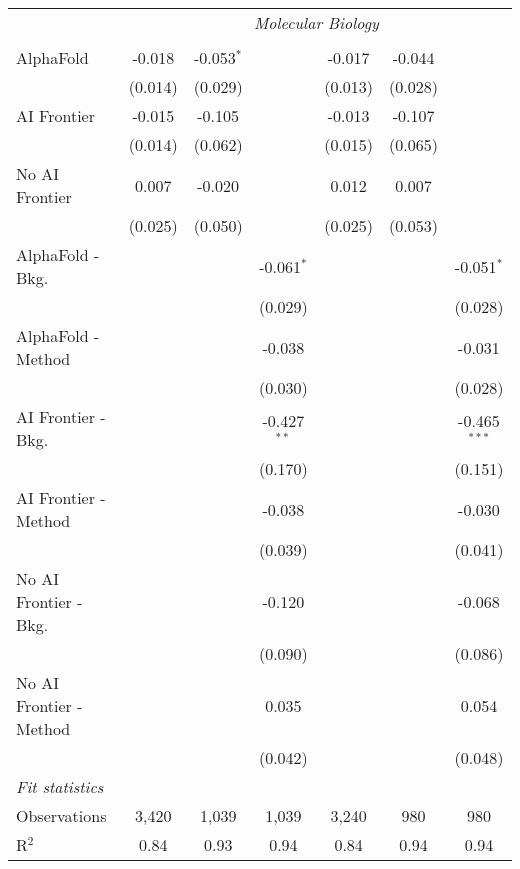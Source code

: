 \begin{tabular}{lcccccc}
 & \multicolumn{6}{c}{\textit{Molecular Biology}} \\ \\
   AlphaFold               & -0.018  & -0.053$^{*}$ &               & -0.017  & -0.044  &   \\   
                           & (0.014) & (0.029)      &               & (0.013) & (0.028) &   \\   
   AI Frontier             & -0.015  & -0.105       &               & -0.013  & -0.107  &   \\   
                           & (0.014) & (0.062)      &               & (0.015) & (0.065) &   \\   
   No AI Frontier          & 0.007   & -0.020       &               & 0.012   & 0.007   &   \\   
                           & (0.025) & (0.050)      &               & (0.025) & (0.053) &   \\   
   AlphaFold - Bkg.        &         &              & -0.061$^{*}$  &         &         & -0.051$^{*}$\\   
                           &         &              & (0.029)       &         &         & (0.028)\\   
   AlphaFold - Method      &         &              & -0.038        &         &         & -0.031\\   
                           &         &              & (0.030)       &         &         & (0.028)\\   
   AI Frontier - Bkg.      &         &              & -0.427$^{**}$ &         &         & -0.465$^{***}$\\   
                           &         &              & (0.170)       &         &         & (0.151)\\   
   AI Frontier - Method    &         &              & -0.038        &         &         & -0.030\\   
                           &         &              & (0.039)       &         &         & (0.041)\\   
   No AI Frontier - Bkg.   &         &              & -0.120        &         &         & -0.068\\   
                           &         &              & (0.090)       &         &         & (0.086)\\   
   No AI Frontier - Method &         &              & 0.035         &         &         & 0.054\\   
                           &         &              & (0.042)       &         &         & (0.048)\\   
   \midrule
   \emph{Fit statistics}\\
   Observations            & 3,420   & 1,039        & 1,039         & 3,240   & 980     & 980\\  
   R$^2$                   & 0.84    & 0.93         & 0.94          & 0.84    & 0.94    & 0.94\\  
   

\end{tabular}
